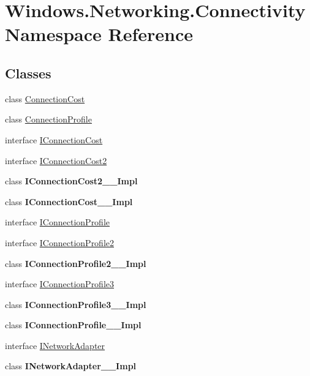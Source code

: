 \hypertarget{namespace_windows_1_1_networking_1_1_connectivity}{}\section{Windows.\+Networking.\+Connectivity Namespace Reference}
\label{namespace_windows_1_1_networking_1_1_connectivity}
\subsection*{Classes}
\begin{DoxyCompactItemize}
\item 
class \hyperlink{class_windows_1_1_networking_1_1_connectivity_1_1_connection_cost}{Connection\+Cost}
\item 
class \hyperlink{class_windows_1_1_networking_1_1_connectivity_1_1_connection_profile}{Connection\+Profile}
\item 
interface \hyperlink{interface_windows_1_1_networking_1_1_connectivity_1_1_i_connection_cost}{I\+Connection\+Cost}
\item 
interface \hyperlink{interface_windows_1_1_networking_1_1_connectivity_1_1_i_connection_cost2}{I\+Connection\+Cost2}
\item 
class {\bfseries I\+Connection\+Cost2\+\_\+\+\_\+\+Impl}
\item 
class {\bfseries I\+Connection\+Cost\+\_\+\+\_\+\+Impl}
\item 
interface \hyperlink{interface_windows_1_1_networking_1_1_connectivity_1_1_i_connection_profile}{I\+Connection\+Profile}
\item 
interface \hyperlink{interface_windows_1_1_networking_1_1_connectivity_1_1_i_connection_profile2}{I\+Connection\+Profile2}
\item 
class {\bfseries I\+Connection\+Profile2\+\_\+\+\_\+\+Impl}
\item 
interface \hyperlink{interface_windows_1_1_networking_1_1_connectivity_1_1_i_connection_profile3}{I\+Connection\+Profile3}
\item 
class {\bfseries I\+Connection\+Profile3\+\_\+\+\_\+\+Impl}
\item 
class {\bfseries I\+Connection\+Profile\+\_\+\+\_\+\+Impl}
\item 
interface \hyperlink{interface_windows_1_1_networking_1_1_connectivity_1_1_i_network_adapter}{I\+Network\+Adapter}
\item 
class {\bfseries I\+Network\+Adapter\+\_\+\+\_\+\+Impl}

\end{DoxyCompactItemize}

